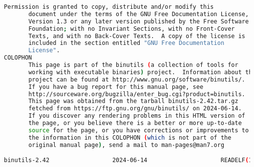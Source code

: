 {{\begin{lstlisting}[language=bash]
       Permission is granted to copy, distribute and/or modify this
       document under the terms of the GNU Free Documentation License,
       Version 1.3 or any later version published by the Free Software
       Foundation; with no Invariant Sections, with no Front-Cover
       Texts, and with no Back-Cover Texts.  A copy of the license is
       included in the section entitled "GNU Free Documentation
       License".
COLOPHON
       This page is part of the binutils (a collection of tools for
       working with executable binaries) project.  Information about the
       project can be found at http://www.gnu.org/software/binutils/.
       If you have a bug report for this manual page, see
       http://sourceware.org/bugzilla/enter_bug.cgi?product=binutils.
       This page was obtained from the tarball binutils-2.42.tar.gz
       fetched from https://ftp.gnu.org/gnu/binutils/ on 2024-06-14.
       If you discover any rendering problems in this HTML version of
       the page, or you believe there is a better or more up-to-date
       source for the page, or you have corrections or improvements to
       the information in this COLOPHON (which is not part of the
       original manual page), send a mail to man-pages@man7.org

binutils-2.42                  2024-06-14                     READELF(1)
\end{lstlisting}
}}
\endinput  %
